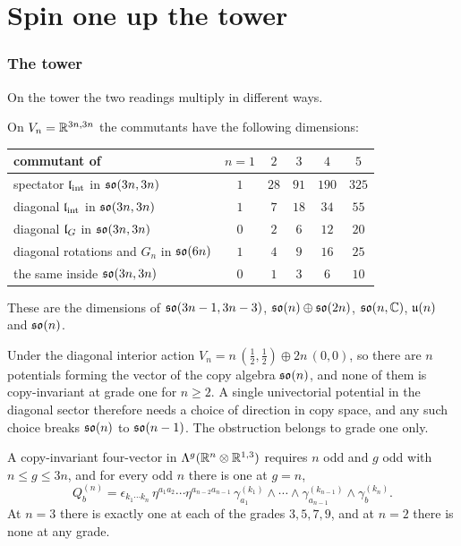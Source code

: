 \section{Spin one up the tower}
\label{sec:w:spinoneupthetower}

\subsubsection{The tower}

\label{sec:spintower}
On the tower the two readings multiply in different ways.

\begin{proposition}
\label{prop:commutantsn}
On $V_n=\mathbb{R}^{3n,3n}$ the commutants have the following dimensions:
\begin{center}
\begin{tabular}{@{}lccccc@{}}
\toprule
commutant of & $n=1$ & $2$ & $3$ & $4$ & $5$\\
\midrule
spectator $\mathfrak l_{\rm int}$ in $\mathfrak{so}(3n,3n)$ & $1$ & $28$ & $91$ & $190$ & $325$\\
diagonal $\mathfrak l_{\rm int}$ in $\mathfrak{so}(3n,3n)$ & $1$ & $7$ & $18$ & $34$ & $55$\\
diagonal $\mathfrak l_G$ in $\mathfrak{so}(3n,3n)$ & $0$ & $2$ & $6$ & $12$ & $20$\\
diagonal rotations and $G_n$ in $\mathfrak{so}(6n)$ & $1$ & $4$ & $9$ & $16$ & $25$\\
the same inside $\mathfrak{so}(3n,3n)$ & $0$ & $1$ & $3$ & $6$ & $10$\\
\bottomrule
\end{tabular}
\end{center}
These are the dimensions of $\mathfrak{so}(3n-1,3n-3)$, $\mathfrak{so}(n)\oplus\mathfrak{so}(2n)$, $\mathfrak{so}(n,\mathbb{C})$, $\mathfrak{u}(n)$ and $\mathfrak{so}(n)$.
\end{proposition}

Under the diagonal interior action $V_n=n\,(\tfrac12,\tfrac12)\oplus2n\,(0,0)$, so there are $n$ potentials forming the vector of the copy
algebra $\mathfrak{so}(n)$, and none of them is copy-invariant at grade one for $n\ge2$. A single univectorial potential in the diagonal sector
therefore needs a choice of direction in copy space, and any such choice breaks $\mathfrak{so}(n)$ to $\mathfrak{so}(n-1)$. The obstruction belongs to grade
one only.

\begin{theorem}
\label{thm:copyparity}
A copy-invariant four-vector in $\Lambda^g(\mathbb{R}^n\otimes\mathbb{R}^{1,3})$ requires $n$ odd and $g$ odd with $n\le g\le3n$, and for every odd $n$
there is one at $g=n$,
\[
Q^{(n)}_b=\epsilon_{k_1\cdots k_n}\,\eta^{a_1a_2}\cdots\eta^{a_{n-2}a_{n-1}}\,\gamma^{(k_1)}_{a_1}\wedge\cdots\wedge\gamma^{(k_{n-1})}_{a_{n-1}}\wedge\gamma^{(k_n)}_b .
\]
At $n=3$ there is exactly one at each of the grades $3,5,7,9$, and at $n=2$ there is none at any grade.
\end{theorem}

